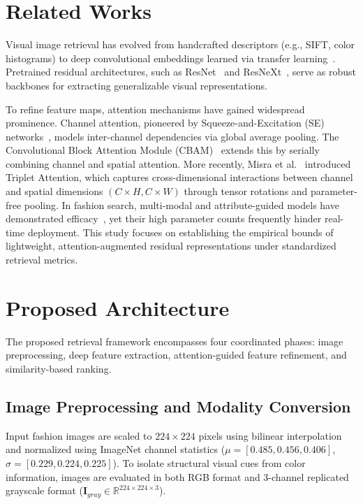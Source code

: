 \documentclass[runningheads]{llncs}
\begin{document}
\section{Related Works}
Visual image retrieval has evolved from handcrafted descriptors (e.g., SIFT, color histograms) to deep convolutional embeddings learned via transfer learning~\cite{ahmed2024recent,alzubi2017content}. Pretrained residual architectures, such as ResNet~\cite{he2016deep} and ResNeXt~\cite{xie2017aggregated}, serve as robust backbones for extracting generalizable visual representations. 

To refine feature maps, attention mechanisms have gained widespread prominence. Channel attention, pioneered by Squeeze-and-Excitation (SE) networks~\cite{hu2018squeeze}, models inter-channel dependencies via global average pooling. The Convolutional Block Attention Module (CBAM)~\cite{woo2018cbam} extends this by serially combining channel and spatial attention. More recently, Misra et al.~\cite{misra2021rotate} introduced Triplet Attention, which captures cross-dimensional interactions between channel and spatial dimensions $(C \times H, C \times W)$ through tensor rotations and parameter-free pooling. In fashion search, multi-modal and attribute-guided models have demonstrated efficacy~\cite{pan2025two,li2024cross,du2025survey,shabir2025advanced}, yet their high parameter counts frequently hinder real-time deployment. This study focuses on establishing the empirical bounds of lightweight, attention-augmented residual representations under standardized retrieval metrics.

\section{Proposed Architecture}
The proposed retrieval framework encompasses four coordinated phases: image preprocessing, deep feature extraction, attention-guided feature refinement, and similarity-based ranking.

\subsection{Image Preprocessing and Modality Conversion}
Input fashion images are scaled to $224 \times 224$ pixels using bilinear interpolation and normalized using ImageNet channel statistics ($\mu = [0.485, 0.456, 0.406]$, $\sigma = [0.229, 0.224, 0.225]$). To isolate structural visual cues from color information, images are evaluated in both RGB format and 3-channel replicated grayscale format ($\mathbf{I}_{gray} \in \mathbb{R}^{224 \times 224 \times 3}$).
\end{document}
